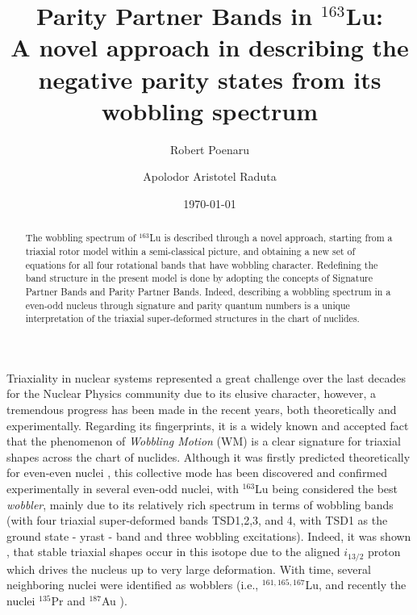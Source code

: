 \documentclass[%
 reprint,
 amsmath,
 amssymb,
 aps,
 floatfix,
]{revtex4-2}
\begin{document}
\title{Parity Partner Bands in $^{163}$Lu: \\ A novel approach in describing the negative parity states from its wobbling spectrum}%

\author{Robert Poenaru}%
\author{Apolodor Aristotel Raduta}%
%
%

\date{\today}

\begin{abstract}
The wobbling spectrum of $^{163}$Lu is described through a novel approach, starting from a triaxial rotor model within a semi-classical picture, and obtaining a new set of equations for all four rotational bands that have wobbling character. Redefining the band structure in the present model is done by adopting the concepts of Signature Partner Bands and Parity Partner Bands. Indeed, describing a wobbling spectrum in a even-odd nucleus through signature and parity quantum numbers is a unique interpretation of the triaxial super-deformed structures in the chart of nuclides.
\end{abstract}

\maketitle



Triaxiality in nuclear systems represented a great challenge over the last decades for the Nuclear Physics community due to its elusive character, however, a tremendous progress has been made in the recent years, both theoretically and experimentally. Regarding its fingerprints, it is a widely known and accepted fact that the phenomenon of \emph{Wobbling Motion} (WM) is a clear signature for triaxial shapes across the chart of nuclides. Although it was firstly predicted theoretically for even-even nuclei \cite{bohr1998nuclear}, this collective mode has been discovered and confirmed experimentally in several even-odd nuclei, with $^{163}$Lu being considered the best \emph{wobbler}, mainly due to its relatively rich spectrum in terms of wobbling bands (with four triaxial super-deformed bands TSD1,2,3, and 4, with TSD1 as the ground state - yrast - band and three wobbling excitations). Indeed, it was shown \cite{odegaard2001evidence}, \cite{jensen2002wobbling} that stable triaxial shapes occur in this isotope due to the aligned $i_{13/2}$ proton which drives the nucleus up to very large deformation. With time, several neighboring nuclei were identified as wobblers (i.e., $^{161,165,167}$Lu, and recently the nuclei $^{135}$Pr \cite{matta2017transverse,sensharma2019two} and $^{187}$Au \cite{sensharma2020longitudinal}).
\end{document}
